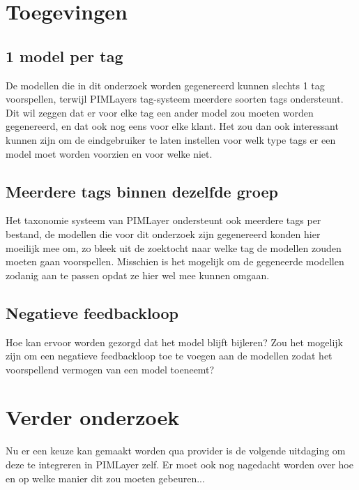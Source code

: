 \section{Toegevingen}
\subsection{1 model per tag}
De modellen die in dit onderzoek worden gegenereerd kunnen slechts 1 tag voorspellen, terwijl PIMLayers tag-systeem meerdere soorten tags ondersteunt. Dit wil zeggen dat er voor elke tag een ander model zou moeten worden gegenereerd, en dat ook nog eens voor elke klant. Het zou dan ook interessant kunnen zijn om de eindgebruiker te laten instellen voor welk type tags er een model moet worden voorzien en voor welke niet.

\subsection{Meerdere tags binnen dezelfde groep}
Het taxonomie systeem van PIMLayer ondersteunt ook meerdere tags per bestand, de modellen die voor dit onderzoek zijn gegenereerd konden hier moeilijk mee om, zo bleek uit de zoektocht naar welke tag de modellen zouden moeten gaan voorspellen. Misschien is het mogelijk om de gegeneerde modellen zodanig aan te passen opdat ze hier wel mee kunnen omgaan.  

\subsection{Negatieve feedbackloop}
Hoe kan ervoor worden gezorgd dat het model blijft bijleren? Zou het mogelijk zijn om een negatieve feedbackloop toe te voegen aan de modellen zodat het voorspellend vermogen van een model toeneemt? 

\section{Verder onderzoek}
Nu er een keuze kan gemaakt worden qua provider is de volgende uitdaging om deze te integreren in PIMLayer zelf. Er moet ook nog nagedacht worden over hoe en op welke manier dit zou moeten gebeuren...




